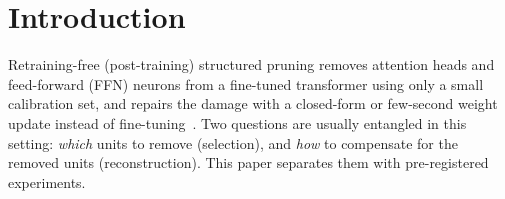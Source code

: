 \documentclass[11pt]{article}
\begin{document}
\begin{abstract}
input-side alignment and the drift-corrected refit (d2i-RI) beats both official baselines. The hypothesis is \emph{not}
supported: no significant difference between d2i-RI and K-prune is detected on QNLI and MNLI-m and ahead by 0.13 points on QQP (not enough to meet the
pre-registered bar of two of three tasks), and it beats the method of Kwon et al.\ by 2.8--8.1 points on all three. We make no claim of improved accuracy
over the state of the art. Because d2i-RI keeps K-prune's masks, its pruned shapes, and so its latency, are K-prune's; latency is reported
descriptively from physically pruned shapes. Results (iii)--(v) use no quantum quantity. The quantum-information quantities are
mathematical representations computed classically; no quantum hardware is used and no quantum advantage is claimed.
\end{abstract}

\section{Introduction}
Retraining-free (post-training) structured pruning removes attention heads and feed-forward (FFN) neurons from a
fine-tuned transformer using only a small calibration set, and repairs the damage with a closed-form or few-second
weight update instead of fine-tuning~\citep{kwon2022fast,park2024kprune,nova2023kcm}. Two questions are usually
entangled in this setting: \emph{which} units to remove (selection), and \emph{how} to compensate for the removed units
(reconstruction). This paper separates them with pre-registered experiments.
\end{document}
